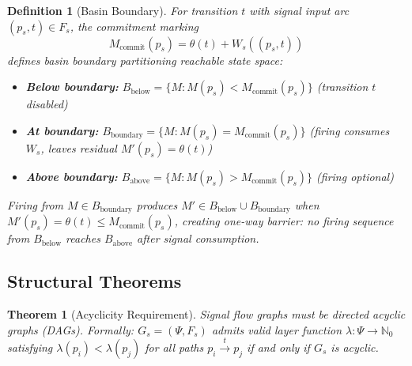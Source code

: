 \documentclass[10pt,letterpaper]{article}
\newtheorem{theorem}{Theorem}
\newtheorem{definition}{Definition}
\begin{document}
\begin{definition}[Basin Boundary]
For transition $t$ with signal input arc $(p_s,t) \in F_s$, the commitment marking
\begin{equation*}
M_{\text{commit}}(p_s) = \theta(t) + W_s((p_s,t))
\end{equation*}
defines basin boundary partitioning reachable state space:
\begin{itemize}
\item \textbf{Below boundary:} $B_{\text{below}} = \{M : M(p_s) < M_{\text{commit}}(p_s)\}$ (transition $t$ disabled)
\item \textbf{At boundary:} $B_{\text{boundary}} = \{M : M(p_s) = M_{\text{commit}}(p_s)\}$ (firing consumes $W_s$, leaves residual $M'(p_s) = \theta(t)$)
\item \textbf{Above boundary:} $B_{\text{above}} = \{M : M(p_s) > M_{\text{commit}}(p_s)\}$ (firing optional)
\end{itemize}
Firing from $M \in B_{\text{boundary}}$ produces $M' \in B_{\text{below}} \cup B_{\text{boundary}}$ when
$M'(p_s) = \theta(t) \leq M_{\text{commit}}(p_s)$,
creating one-way barrier: no firing sequence from $B_{\text{below}}$ reaches $B_{\text{above}}$ after signal consumption.
\end{definition}

\subsection{Structural Theorems}

\begin{theorem}[Acyclicity Requirement]
Signal flow graphs must be directed acyclic graphs (DAGs). Formally: $G_s = (\Psi, F_s)$ admits valid layer function
$\lambda: \Psi \rightarrow \mathbb{N}_0$
satisfying $\lambda(p_i) < \lambda(p_j)$ for all paths $p_i \xrightarrow{t} p_j$ if and only if $G_s$ is acyclic.
\end{theorem}
\end{document}
